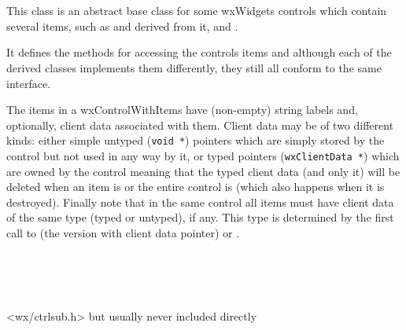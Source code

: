 
\section{}\label{wxcontrolwithitems}

This class is an abstract base class for some wxWidgets controls which contain
several items, such as  and
 derived from it,
 and .

It defines the methods for accessing the controls items and although each of
the derived classes implements them differently, they still all conform to the
same interface.

The items in a wxControlWithItems have (non-empty) string labels and,
optionally, client data associated with them. Client data may be of two
different kinds: either simple untyped ({\tt void *}) pointers which are simply
stored by the control but not used in any way by it, or typed pointers
({\tt wxClientData *}) which are owned by the control meaning that the typed
client data (and only it) will be deleted when an item is
 or the entire control is
 (which also happens when it is
destroyed). Finally note that in the same control all items must have client
data of the same type (typed or untyped), if any. This type is determined by
the first call to  (the version with
client data pointer) or .


\\
\\
\\


<wx/ctrlsub.h> but usually never included directly

